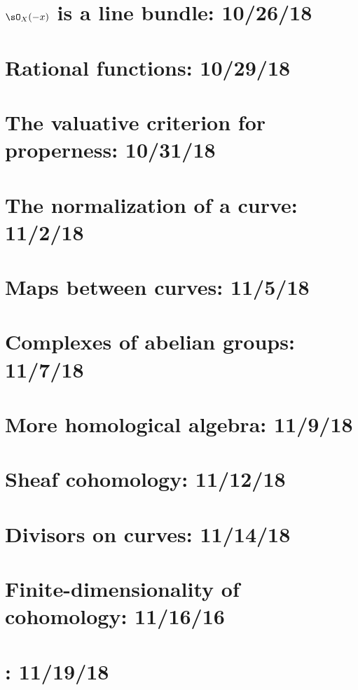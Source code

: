 \documentclass{notes_d}
\begin{document}
\section{$\sO_X(-x)$ is a line bundle: 10/26/18}
	
\section{Rational functions: 10/29/18}
	
\section{The valuative criterion for properness: 10/31/18}
	
\section{The normalization of a curve: 11/2/18}
	
\section{Maps between curves: 11/5/18}
	
\section{Complexes of abelian groups: 11/7/18}
	
\section{More homological algebra: 11/9/18}
	
\section{Sheaf cohomology: 11/12/18}
	
\section{Divisors on curves: 11/14/18}
	
\section{Finite-dimensionality of cohomology: 11/16/16}
	
\section{: 11/19/18}
\end{document}
